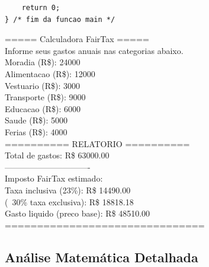 \documentclass[12pt,a4paper]{article}
\begin{document}
\begin{respostabox}
\begin{lstlisting}
    return 0;
} /* fim da funcao main */
\end{lstlisting}

\begin{saida}
===== Calculadora FairTax =====\\[2pt]
Informe seus gastos anuais nas categorias abaixo.\\[2pt]
Moradia (R\$): 24000\\
Alimentacao (R\$): 12000\\
Vestuario (R\$): 3000\\
Transporte (R\$): 9000\\
Educacao (R\$): 6000\\
Saude (R\$): 5000\\
Ferias (R\$): 4000\\[2pt]
========== RELATORIO ==========\\
Total de gastos: \hspace{4em} R\$ \hspace{0.5em}63000.00\\
-------------------------------\\
Imposto FairTax estimado:\\
\hphantom{xx}Taxa inclusiva (23\%): \hspace{0.4em} R\$ \hspace{1em}14490.00\\
\hphantom{xx}(~30\% taxa exclusiva): R\$ \hspace{1em}18818.18\\
\hphantom{xx}Gasto liquido (preco base): R\$ \hspace{1em}48510.00\\
===============================
\end{saida}
\end{respostabox}

\subsection*{Análise Matemática Detalhada}
\end{document}
